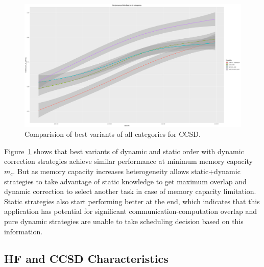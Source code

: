 \documentclass[runningheads]{llncs} %
\begin{document}
	\begin{figure}[htb]
	\includegraphics[scale=0.25]{../ExperimentalResults/inverse_ratio_to_optimal_ccsd-best.pdf}
	\caption{Comparision of best variants of all categories for CCSD.}
	\label{fig:ratio_to_optimal_best_ccsd}
	\end{figure}

Figure~\ref{fig:ratio_to_optimal_best_ccsd} shows that best variants of dynamic and static order with dynamic correction  strategies achieve similar performance at minimum memory capacity $m_c$. But as memory capacity increases heterogeneity allows static+dynamic strategies to take advantage of static knowledge to get maximum overlap and dynamic correction to select another task in case of memory capacity limitation. Static strategies also start performing better at the end, which indicates that this application has potential for significant communication-computation overlap and pure dynamic strategies are unable to take scheduling decision based on this information.

\subsection{HF and CCSD Characteristics}
 
\end{document}
